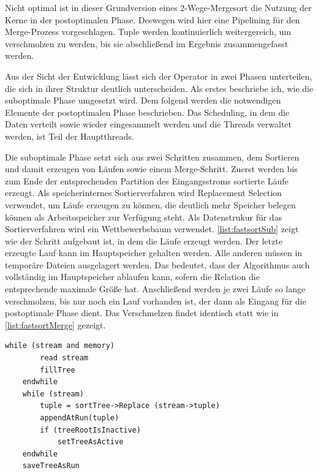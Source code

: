 \documentclass[a4paper,12pt,twoside]{article}
\begin{document}
Nicht optimal ist in dieser Grundversion eines 2-Wege-Mergesort die Nutzung der Kerne in der postoptimalen Phase. Deswegen wird hier eine Pipelining für den Merge-Prozess vorgeschlagen. Tuple werden kontinuierlich weitergereich, um verschmolzen zu werden, bis sie abschließend im Ergebnis zusammengefasst werden. 

Aus der Sicht der Entwicklung lässt sich der Operator in zwei Phasen unterteilen, die sich in ihrer Struktur deutlich unterscheiden. Als erstes beschriebe ich, wie die suboptimale Phase umgesetzt wird. Dem folgend werden die notwendigen Elemente der postoptimalen Phase beschrieben. Das Scheduling, in dem die Daten verteilt sowie wieder eingesammelt werden und die Threads verwaltet werden, ist Teil der Hauptthreads.

Die suboptimale Phase setzt sich aus zwei Schritten zusammen, dem Sortieren und damit erzeugen von Läufen sowie einem Merge-Schritt. Zuerst werden bis zum Ende der entsprechenden Partition des Eingangsstroms sortierte Läufe erzeugt. Als speicherinternes Sortierverfahren wird Replacement Selection verwendet, um Läufe erzeugen zu können, die deutlich mehr Speicher belegen können als Arbeitsspeicher zur Verfügung steht. Als Datenstrukur für das Sortierverfahren wird ein Wettbewerbsbaum verwendet. \autoref{list:fastsortSub} zeigt wie der Schritt aufgebaut ist, in dem die Läufe erzeugt werden. Der letzte erzeugte Lauf kann im Hauptspeicher gehalten werden. Alle anderen müssen in temporäre Dateien ausgelagert werden. Das bedeutet, dass der Algorithmus auch vollständig im Hauptspeicher ablaufen kann, sofern die Relation die entsprechende maximale Größe hat. Anschließend werden je zwei Läufe so lange verschmolzen, bis nur noch ein Lauf vorhanden ist, der dann als Eingang für die postoptimale Phase dient. Das Verschmelzen findet identisch statt wie in  \autoref{list:fastsortMerge} gezeigt.

\begin{minipage}{\linewidth}
	\begin{lstlisting}[caption={Fastsort: Erzeugen der Runs in der Suboptimalen Phase}, label=list:fastsortSub] 
	while (stream and memory) 
		read stream
		fillTree
	endwhile
	while (stream)
		tuple = sortTree->Replace (stream->tuple)
		appendAtRun(tuple)
		if (treeRootIsInactive)
			setTreeAsActive
	endwhile
	saveTreeAsRun
	\end{lstlisting}
\end{minipage}
\end{document}
